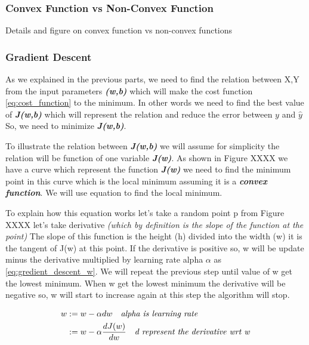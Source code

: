 \subsubsection{Convex Function vs Non-Convex Function }


Details and figure on convex function vs non-convex functions

\subsubsection{Gradient Descent}

As we explained in the previous parts, we need to find the relation between X,Y from the input parameters \textbf{\textit{(w,b)}} which will make the cost function  \eqref{eq:cost_function} to the minimum. In other words we need to find the best value of \textbf{\textit{J(w,b)}} which will represent the relation and reduce the error between $y$ and $\widehat{y}$  So, we need to minimize \textbf{\textit{J(w,b)}}.  %

To illustrate the relation between \textbf{\textit{J(w,b)}} we will assume for simplicity the relation will be function of one variable \textbf{\textit{J(w)}}. As shown in Figure XXXX we have a curve which represent the function \textbf{\textit{J(w)}} we need to find the minimum point in this curve which is the local minimum assuming it is a  \textbf{\textit{convex function}}. We will use equation \label{eq:gredient_descent_w} to find the local minimum.

To explain how this equation works let's take a random point p from Figure XXXX let's take derivative \textit{(which by definition is the slope of the function at the point)} The slope of this function is the height (h) divided into the width (w) it is the tangent of J(w) at this point. If the derivative is positive so, w will be update minus the derivative multiplied by learning rate alpha $\alpha$ as \eqref{eq:gredient_descent_w}. We will repeat the previous step until value of w get the lowest minimum. When w get the lowest minimum the derivative will be negative so, w will start to increase again at this step the algorithm will stop.



\begin{equation}\label{eq:gredient_descent_w}
  \begin{split}
    w & := w - \alpha dw \quad \text{\textit{alpha is learning rate}}\\
      & := w - \alpha \frac{dJ(w)}{dw} \quad \text{\textit{d represent the derivative wrt w}}
  \end{split}
\end{equation}

